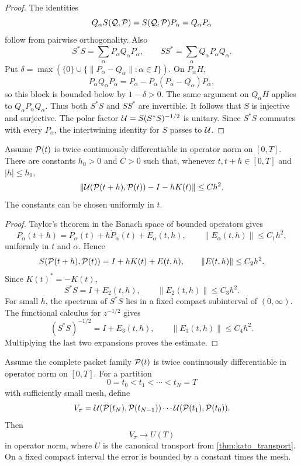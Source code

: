 \begin{proof}
The identities
\[
Q_\alpha S(\mathcal Q,\mathcal P)
=
S(\mathcal Q,\mathcal P)P_\alpha
=
Q_\alpha P_\alpha
\]
follow from pairwise orthogonality.  Also
\[
S^*S
=
\sum_\alpha P_\alpha Q_\alpha P_\alpha,
\qquad
SS^*
=
\sum_\alpha Q_\alpha P_\alpha Q_\alpha.
\]
Put $\delta=\max(\{0\}\cup\{\|P_\alpha-Q_\alpha\|:\alpha\in I\})$.  On $P_\alpha H$,
\[
P_\alpha Q_\alpha P_\alpha
=
P_\alpha-P_\alpha(P_\alpha-Q_\alpha)P_\alpha,
\]
so this block is bounded below by $1-\delta>0$.  The same argument on $Q_\alpha H$ applies to $Q_\alpha P_\alpha Q_\alpha$.  Thus both $S^*S$ and $SS^*$ are invertible.  It follows that $S$ is injective and surjective.  The polar factor $\mathcal U=S(S^*S)^{-1/2}$ is unitary.  Since $S^*S$ commutes with every $P_\alpha$, the intertwining identity for $S$ passes to $\mathcal U$.
\end{proof}

\begin{lemma}\label{lem:one_step_direct_rotation}
Assume $\mathcal P(t)$ is twice continuously differentiable in operator norm on $[0,T]$.  There are constants $h_0>0$ and $C>0$ such that, whenever $t,t+h\in[0,T]$ and $|h|\le h_0$,
\[
\left\|
\mathcal U(\mathcal P(t+h),\mathcal P(t))
-
I
-
hK(t)
\right\|
\le
Ch^2.
\]
The constants can be chosen uniformly in $t$.
\end{lemma}

\begin{proof}
Taylor's theorem in the Banach space of bounded operators gives
\[
P_\alpha(t+h)
=
P_\alpha(t)+h\dot P_\alpha(t)+E_{\alpha}(t,h),
\qquad
\|E_{\alpha}(t,h)\|\le C_1h^2,
\]
uniformly in $t$ and $\alpha$.  Hence
\[
S(\mathcal P(t+h),\mathcal P(t))
=
I+hK(t)+E(t,h),
\qquad
\|E(t,h)\|\le C_2h^2.
\]
Since $K(t)^*=-K(t)$,
\[
S^*S=I+E_2(t,h),
\qquad
\|E_2(t,h)\|\le C_3h^2.
\]
For small $h$, the spectrum of $S^*S$ lies in a fixed compact subinterval of $(0,\infty)$.  The functional calculus for $z^{-1/2}$ gives
\[
(S^*S)^{-1/2}=I+E_3(t,h),
\qquad
\|E_3(t,h)\|\le C_4h^2.
\]
Multiplying the last two expansions proves the estimate.
\end{proof}

\begin{theorem}\label{thm:direct_rotation_convergence}
Assume the complete packet family $\mathcal P(t)$ is twice continuously differentiable in operator norm on $[0,T]$.  For a partition
\[
0=t_0<t_1<\cdots<t_N=T
\]
with sufficiently small mesh, define
\[
V_\pi
=
\mathcal U(\mathcal P(t_N),\mathcal P(t_{N-1}))
\cdots
\mathcal U(\mathcal P(t_1),\mathcal P(t_0)).
\]
Then
\[
V_\pi\longrightarrow U(T)
\]
in operator norm, where $U$ is the canonical transport from \cref{thm:kato_transport}.  On a fixed compact interval the error is bounded by a constant times the mesh.
\end{theorem}

